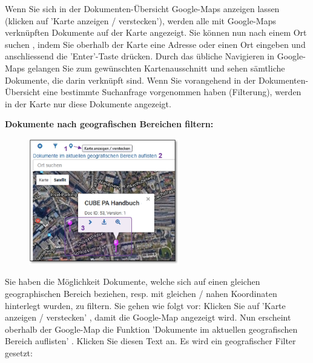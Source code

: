 Wenn Sie sich in der Dokumenten-Übersicht Google-Maps anzeigen lassen (klicken auf 'Karte anzeigen / verstecken'), werden alle mit Google-Maps verknüpften Dokumente auf der Karte angezeigt. Sie können nun nach einem Ort suchen , indem Sie oberhalb der Karte eine Adresse oder einen Ort eingeben und anschliessend die 'Enter'-Taste drücken. Durch das übliche Navigieren in Google-Maps gelangen Sie zum gewünschten Kartenausschnitt und sehen sämtliche Dokumente, die darin verknüpft sind. Wenn Sie vorangehend in der Dokumenten-Übersicht eine bestimmte Suchanfrage vorgenommen haben (Filterung), werden in der Karte nur diese Dokumente angezeigt. \newline

\pagebreak
\textbf{Dokumente nach geografischen Bereichen filtern:} \\

\begin{figure}
  \vspace{-35pt}
  \begin{center}
    \includegraphics[height=55mm]{../chapters/11_Dokumentenablage/pictures/11-2-3_GeoBereichFilter.jpg}
  \end{center}
  \vspace{-20pt}
  \vspace{-10pt}
\end{figure}
Sie haben die Möglichkeit Dokumente, welche sich auf einen gleichen geographischen Bereich beziehen, resp. mit gleichen / nahen Koordinaten hinterlegt wurden, zu filtern. Sie gehen wie folgt vor: Klicken Sie auf 'Karte anzeigen / verstecken' , damit die Google-Map angezeigt wird. Nun erscheint oberhalb der Google-Map die Funktion 'Dokumente im aktuellen geografischen Bereich auflisten' . Klicken Sie diesen Text an. Es wird ein geografischer Filter gesetzt:

\vspace{1cm} 

